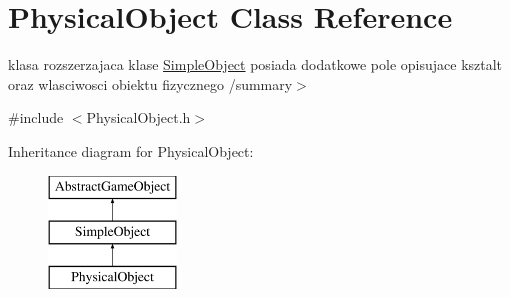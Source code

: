 \hypertarget{class_physical_object}{}\section{Physical\+Object Class Reference}
\label{class_physical_object}


klasa rozszerzajaca klase \hyperlink{class_simple_object}{Simple\+Object} posiada dodatkowe pole opisujace ksztalt oraz wlasciwosci obiektu fizycznego /summary$>$  




{\ttfamily \#include $<$Physical\+Object.\+h$>$}

Inheritance diagram for Physical\+Object\+:\begin{figure}[H]
\begin{center}
\leavevmode
\includegraphics[height=3.000000cm]{class_physical_object}
\end{center}
\end{figure}
